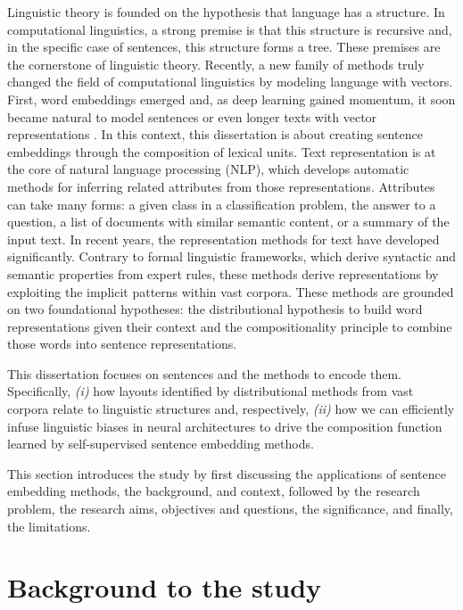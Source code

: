 Linguistic theory is founded on the hypothesis that language has a structure. In computational linguistics, a strong premise is that this structure is recursive \parencite{chomsky_56} and, in the specific case of sentences, this structure forms a tree. These premises are the cornerstone of linguistic theory. Recently, a new family of methods truly changed the field of computational linguistics by modeling language with vectors. First, word embeddings emerged \parencite{mikolov_13a, mikolov_13b} and, as deep learning gained momentum, it soon became natural to model sentences or even longer texts with vector representations \parencite{hochreiter_97, cho_14}. In this context, this dissertation is about creating sentence embeddings through the composition of lexical units. Text representation is at the core of natural language processing (NLP), which develops automatic methods for inferring related attributes from those representations. Attributes can take many forms: a given class in a classification problem, the answer to a question, a list of documents with similar semantic content, or a summary of the input text. In recent years, the representation methods for text have developed significantly. Contrary to formal linguistic frameworks, which derive syntactic and semantic properties from expert rules, these methods derive representations by exploiting the implicit patterns within vast corpora. These methods are grounded on two foundational hypotheses: the distributional hypothesis to build word representations given their context and the compositionality principle to combine those words into sentence representations.



This dissertation focuses on sentences and the methods to encode them. Specifically, \textit{(i)} how layouts identified by distributional methods from vast corpora relate to linguistic structures and, respectively, \textit{(ii)} how we can efficiently infuse linguistic biases in neural architectures to drive the composition function learned by self-supervised sentence embedding methods.

This section introduces the study by first discussing the applications of sentence embedding methods, the background, and context, followed by the research problem, the research aims, objectives and questions, the significance, and finally, the limitations.


\section{Background to the study}

